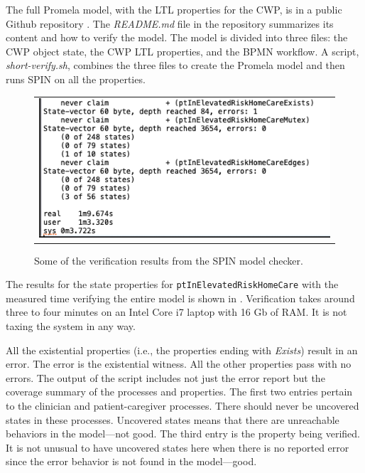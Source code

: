 The full Promela model, with the LTL properties for the CWP, is in a public Github repository \cite{repo}. The \emph{README.md} file in the repository summarizes its content and how to verify the model. The model is divided into three files: the CWP object state, the CWP LTL properties, and the BPMN workflow. A script, \emph{short-verify.sh}, combines the three files to create the Promela model and then runs SPIN on all the properties.

\begin{figure}[t]
  \begin{center}
    \begin{tabular}{c}
      \includegraphics[scale=0.50]{proof-digest.png}
    \end{tabular}
  \end{center}
\caption{Some of the verification results from the SPIN model checker.}
\label{fig:proof}
\end{figure}

The results for the state properties for \texttt{ptInElevatedRiskHomeCare} with the measured time verifying the entire model is shown in . Verification takes around three to four minutes on an Intel Core i7 laptop with 16 Gb of RAM. It is not taxing the system in any way. 

All the existential properties (i.e., the properties ending with \emph{Exists}) result in an error. The error is the existential witness. All the other properties pass with no errors. The output of the script includes not just the error report but the coverage summary of the processes and properties. The first two entries pertain to the clinician and patient-caregiver processes. There should never be uncovered states in these processes. Uncovered states means that there are unreachable behaviors in the model---not good. The third entry is the property being verified. It is not unusual to have uncovered states here when there is no reported error since the error behavior is not found in the model---good.

